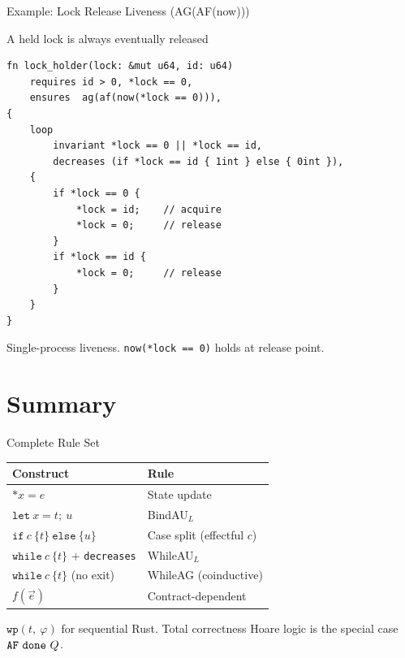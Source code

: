 \documentclass[aspectratio=169]{beamer}
\newcommand{\rust}[1]{\ensuremath{\mathtt{#1}}}
\newcommand{\rlet}[3]{\ensuremath{\rust{let}~#1 = #2\rust{;}~#3}}
\newcommand{\rmut}[2]{\ensuremath{\rust{*}#1 = #2}}
\newcommand{\rwhile}[2]{\ensuremath{\rust{while}~#1~\{#2\}}}
\newcommand{\rif}[3]{\ensuremath{\rust{if}~#1~\{#2\}~\rust{else}~\{#3\}}}
\newcommand{\rcall}[2]{\ensuremath{#1(#2)}}
\newcommand{\wpx}[2]{\ensuremath{\mathtt{wp}(#1,~#2)}}
\begin{document}
\begin{frame}[fragile]{Example: Lock Release Liveness (AG(AF(now)))}
  \begin{block}{A held lock is always eventually released}
  \end{block}
  \vspace{-0.2cm}
  \begin{lstlisting}
fn lock_holder(lock: &mut u64, id: u64)
    requires id > 0, *lock == 0,
    ensures  ag(af(now(*lock == 0))),
{
    loop
        invariant *lock == 0 || *lock == id,
        decreases (if *lock == id { 1int } else { 0int }),
    {
        if *lock == 0 {
            *lock = id;    // acquire
            *lock = 0;     // release
        }
        if *lock == id {
            *lock = 0;     // release
        }
    }
}
  \end{lstlisting}
  \vspace{-0.3cm}
  {\footnotesize Single-process liveness. \verb|now(*lock == 0)| holds at release point.}
\end{frame}

\section{Summary}

\begin{frame}{Complete Rule Set}
  \begin{center}
  \small
  \begin{tabular}{l l}
    \textbf{Construct} & \textbf{Rule} \\
    \hline
    $\rmut{x}{e}$ & State update \\
    $\rlet{x}{t}{u}$ & BindAU$_L$ \\
    $\rif{c}{t}{u}$ & Case split (effectful $c$) \\
    $\rwhile{c}{t}$ + \texttt{decreases} & WhileAU$_L$ \\
    $\rwhile{c}{t}$ (no exit) & WhileAG (coinductive) \\
    $\rcall{f}{\vec{e}}$ & Contract-dependent \\
  \end{tabular}
  \end{center}

  \vspace{0.3cm}
  $\wpx{t}{\varphi}$ for sequential Rust.
  Total correctness Hoare logic is the special case $\AF{\done{Q}}$.
\end{frame}
\end{document}
